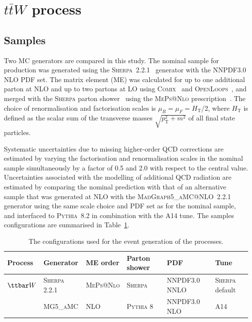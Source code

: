 \section{$t\bar{t}W$ process}
\label{sec:ttV}


\subsection{Samples}
Two MC generators are compared in this study.
The nominal sample for \ttW production was generated using the \textsc{Sherpa}~2.2.1~\cite{sherpa} generator with the NNPDF3.0 NLO PDF set.
The matrix element (ME) was calculated for up to one additional parton at NLO and up to two partons at LO using
\textsc{Comix}~\cite{Gleisberg:2008fv} and \textsc{OpenLoops}~\cite{Cascioli:2011va}, and merged with the \textsc{Sherpa} parton shower~\cite{Schumann:2007mg} using the \textsc{MePs@Nlo} prescription~\cite{Hoeche:2012yf}.
The choice of renormalisation and factorisation scales is $\mu_R = \mu_F = H_\textrm{T}$/2, where $H_\textrm{T}$ is defined as the scalar sum of the transverse masses $\sqrt{p_\textrm{T}^2+m^2}$ of all final state particles.



Systematic uncertainties due to missing higher-order QCD corrections are estimated by varying the factorisation and renormalisation scales in the nominal sample simultaneously by a factor of 0.5 and 2.0 with respect to the central value. %
Uncertainties associated with the modelling of additional QCD radiation are estimated by comparing the nominal \ttW prediction with that of an alternative sample that was generated at NLO with the \textsc{MadGraph5\_aMC@NLO}~2.2.1 generator using the same scale choice and PDF set as for the nominal sample, and interfaced to \textsc{Pythia}~8.2 in combination with the A14 tune. 
The samples configurations are summarised in Table~\ref{tab:mcconfig}.
\begin{table}
\begin{center}
\caption{\label{tab:mcconfig}
The configurations used for the event generation of the \ttW processes.}
\vspace{0.25cm}
{\small
\setlength\tabcolsep{1.5pt}
\begin{tabular}{llllll}
\hline\hline
Process & Generator & ME order & Parton shower & PDF & Tune  \\
\hline
$\ttbar W$  & \textsc{Sherpa 2.2.1} & \textsc{MePs@Nlo} & \textsc{Sherpa} &  NNPDF3.0 NNLO & \textsc{Sherpa} default \\
& \textsc{MG5\_aMC} & NLO & \textsc{Pythia} 8 & NNPDF3.0 NLO & A14   \\
\hline\hline
\end{tabular}
}
\end{center}
\end{table}


